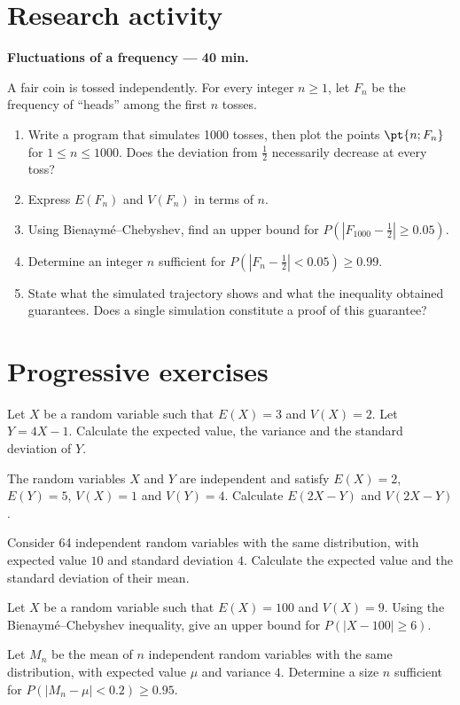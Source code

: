 \section{Research activity}\textbf{Fluctuations of a frequency --- 40 min.}\par A fair coin is tossed independently. For every integer $n\ge1$, let $F_n$ be the frequency of ``heads'' among the first $n$ tosses.
\begin{enumerate}\item Write a program that simulates 1000 tosses, then plot the points $\pt{n;F_n}$ for $1\le n\le1000$. Does the deviation from $\frac12$ necessarily decrease at every toss?
\item Express $E(F_n)$ and $V(F_n)$ in terms of $n$.
\item Using Bienaymé--Chebyshev, find an upper bound for $P(|F_{1000}-\frac12|\ge\num{0,05})$.
\item Determine an integer $n$ sufficient for $P(|F_n-\frac12|<\num{0,05})\ge\num{0,99}$.
\item State what the simulated trajectory shows and what the inequality obtained guarantees. Does a single simulation constitute a proof of this guarantee?\end{enumerate}

\mxnewpage
\section{Progressive exercises}

Let $X$ be a random variable such that $E(X)=3$ and $V(X)=2$. Let $Y=4X-1$. Calculate the expected value, the variance and the standard deviation of $Y$.

The random variables $X$ and $Y$ are independent and satisfy $E(X)=2$, $E(Y)=5$, $V(X)=1$ and $V(Y)=4$. Calculate $E(2X-Y)$ and $V(2X-Y)$.

Consider 64 independent random variables with the same distribution, with expected value $10$ and standard deviation $4$. Calculate the expected value and the standard deviation of their mean.

Let $X$ be a random variable such that $E(X)=100$ and $V(X)=9$. Using the Bienaymé--Chebyshev inequality, give an upper bound for $P(|X-100|\ge6)$.

Let $M_n$ be the mean of $n$ independent random variables with the same distribution, with expected value $\mu$ and variance $4$. Determine a size $n$ sufficient for $P(|M_n-\mu|<\num{0,2})\ge\num{0,95}$.

